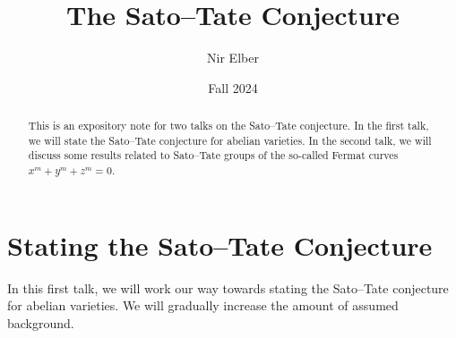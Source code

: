 \documentclass{article}
\title{The Sato--Tate Conjecture}
\author{Nir Elber}
\date{Fall 2024}
\begin{document}
\maketitle

\begin{abstract}
	This is an expository note for two talks on the Sato--Tate conjecture. In the first talk, we will state the Sato--Tate conjecture for abelian varieties. In the second talk, we will discuss some results related to Sato--Tate groups of the so-called Fermat curves $x^m+y^m+z^m=0$.
\end{abstract}

\tableofcontents

\section{Stating the Sato--Tate Conjecture}
In this first talk, we will work our way towards stating the Sato--Tate conjecture for abelian varieties. We will gradually increase the amount of assumed background.
\end{document}

